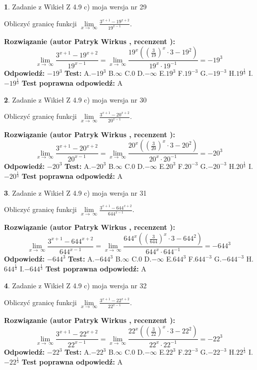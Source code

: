 \documentclass[12pt, a4paper]{article}
\theoremstyle{definition} %
\newtheorem{zad}{}
\newcommand{\zadStart}[1]{\begin{zad}#1\newline}
\newcommand{\zadStop}{\end{zad}}
\newcommand{\rozwStart}[2]{\noindent \textbf{Rozwiązanie (autor #1 , recenzent #2): }\newline}
\newcommand{\rozwStop}{\newline}
\newcommand{\odpStart}{\noindent \textbf{Odpowiedź:}\newline}
\newcommand{\odpStop}{\newline}
\newcommand{\testStart}{\noindent \textbf{Test:}\newline}
\newcommand{\testStop}{\newline}
\newcommand{\kluczStart}{\noindent \textbf{Test poprawna odpowiedź:}\newline}
\newcommand{\kluczStop}{\newline}
\begin{document}
\zadStart{Zadanie z Wikieł Z 4.9 c) moja wersja nr 29}


Obliczyć granicę funkcji  $\lim\limits_{x\to\ \infty}\frac{3^{x+1}-19^{x+2}}{19^{x-1}}$.
\zadStop
\rozwStart{Patryk Wirkus}{}
$$\lim\limits_{x\to\ \infty}\frac{3^{x+1}-19^{x+2}}{19^{x-1}}=\lim\limits_{x\to\ \infty}\frac{19^{x}((\frac{3}{19})^{x}\cdot 3 -19^{2})}{19^{x}\cdot 19^{-1}} = -19^{3}$$
\rozwStop
\odpStart
$-19^{3}$
\odpStop
\testStart
A.$-19^{3}$ B.$\infty$ C.$0$ D.$-\infty$ E.$19^{3}$
F.$19^{-3}$ G.$-19^{-3}$
H.$19^{\frac{1}{3}}$
I.$-19^{\frac{1}{3}}$
\testStop
\kluczStart
A
\kluczStop



\zadStart{Zadanie z Wikieł Z 4.9 c) moja wersja nr 30}


Obliczyć granicę funkcji  $\lim\limits_{x\to\ \infty}\frac{3^{x+1}-20^{x+2}}{20^{x-1}}$.
\zadStop
\rozwStart{Patryk Wirkus}{}
$$\lim\limits_{x\to\ \infty}\frac{3^{x+1}-20^{x+2}}{20^{x-1}}=\lim\limits_{x\to\ \infty}\frac{20^{x}((\frac{3}{20})^{x}\cdot 3 -20^{2})}{20^{x}\cdot 20^{-1}} = -20^{3}$$
\rozwStop
\odpStart
$-20^{3}$
\odpStop
\testStart
A.$-20^{3}$ B.$\infty$ C.$0$ D.$-\infty$ E.$20^{3}$
F.$20^{-3}$ G.$-20^{-3}$
H.$20^{\frac{1}{3}}$
I.$-20^{\frac{1}{3}}$
\testStop
\kluczStart
A
\kluczStop



\zadStart{Zadanie z Wikieł Z 4.9 c) moja wersja nr 31}


Obliczyć granicę funkcji  $\lim\limits_{x\to\ \infty}\frac{3^{x+1}-644^{x+2}}{644^{x-1}}$.
\zadStop
\rozwStart{Patryk Wirkus}{}
$$\lim\limits_{x\to\ \infty}\frac{3^{x+1}-644^{x+2}}{644^{x-1}}=\lim\limits_{x\to\ \infty}\frac{644^{x}((\frac{3}{644})^{x}\cdot 3 -644^{2})}{644^{x}\cdot 644^{-1}} = -644^{3}$$
\rozwStop
\odpStart
$-644^{3}$
\odpStop
\testStart
A.$-644^{3}$ B.$\infty$ C.$0$ D.$-\infty$ E.$644^{3}$
F.$644^{-3}$ G.$-644^{-3}$
H.$644^{\frac{1}{3}}$
I.$-644^{\frac{1}{3}}$
\testStop
\kluczStart
A
\kluczStop



\zadStart{Zadanie z Wikieł Z 4.9 c) moja wersja nr 32}


Obliczyć granicę funkcji  $\lim\limits_{x\to\ \infty}\frac{3^{x+1}-22^{x+2}}{22^{x-1}}$.
\zadStop
\rozwStart{Patryk Wirkus}{}
$$\lim\limits_{x\to\ \infty}\frac{3^{x+1}-22^{x+2}}{22^{x-1}}=\lim\limits_{x\to\ \infty}\frac{22^{x}((\frac{3}{22})^{x}\cdot 3 -22^{2})}{22^{x}\cdot 22^{-1}} = -22^{3}$$
\rozwStop
\odpStart
$-22^{3}$
\odpStop
\testStart
A.$-22^{3}$ B.$\infty$ C.$0$ D.$-\infty$ E.$22^{3}$
F.$22^{-3}$ G.$-22^{-3}$
H.$22^{\frac{1}{3}}$
I.$-22^{\frac{1}{3}}$
\testStop
\kluczStart
A
\kluczStop
\end{document}
